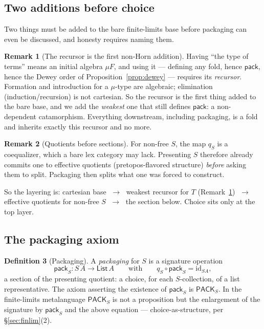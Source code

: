 \documentclass[11pt]{article}
\theoremstyle{definition}
\newtheorem{definition}{Definition}[section]
\newtheorem{remark}[definition]{Remark}
\theoremstyle{plain}
\newcommand{\T}{T}
\newcommand{\Coll}{S}
\newcommand{\List}{\mathsf{List}}
\newcommand{\Pack}{\mathsf{PACK}}
\newcommand{\pack}{\mathsf{pack}}
\newcommand{\id}{\mathrm{id}}
\newcommand{\qmap}{q}
\begin{document}
\subsection{Two additions before choice}

Two things must be added to the bare finite-limits base before packaging can
even be discussed, and honesty requires naming them.

\begin{remark}[The recursor is the first non-Horn addition]
\label{rem:recursor}
Having ``the type of terms'' means an initial algebra $\mu F$, and using it
--- defining any fold, hence $\pack$, hence the Dewey order of
Proposition~\ref{prop:dewey} --- requires its \emph{recursor}. Formation and
introduction for a $\mu$-type are algebraic; elimination (induction/recursion)
is not cartesian. So the recursor is the first thing added to the bare base,
and we add the \emph{weakest} one that still defines $\pack$: a
non-dependent catamorphism. Everything downstream, including packaging, is a
fold and inherits exactly this recursor and no more.
\end{remark}

\begin{remark}[Quotients before sections]
For non-free $\Coll$, the map $\qmap_{\Coll}$ is a coequalizer, which a bare
lex category may lack. Presenting $\Coll$ therefore already commits one to
effective quotients (pretopos-flavored structure) \emph{before} asking them to
split. Packaging then splits what one was forced to construct.
\end{remark}

So the layering is: cartesian base $\;\to\;$ weakest recursor for $\T$
(Remark~\ref{rem:recursor}) $\;\to\;$ effective quotients for non-free $\Coll$
$\;\to\;$ the section below. Choice sits only at the top layer.

\subsection{The packaging axiom}

\begin{definition}[Packaging]
\label{def:pack}
A \emph{packaging} for $\Coll$ is a signature operation
\[
  \pack_{\Coll} : \Coll\,A \longrightarrow \List\,A
  \qquad\text{with}\qquad
  \qmap_{\Coll} \circ \pack_{\Coll} = \id_{\Coll A},
\]
a section of the presenting quotient: a choice, for each $\Coll$-collection, of
a list representative. The axiom asserting the existence of $\pack_{\Coll}$ is
$\Pack_{\Coll}$. In the finite-limits metalanguage $\Pack_{\Coll}$ is not a
proposition but the enlargement of the signature by $\pack_{\Coll}$ and the
above equation --- choice-as-structure, per \S\ref{sec:finlim}(2).
\end{definition}
\end{document}
